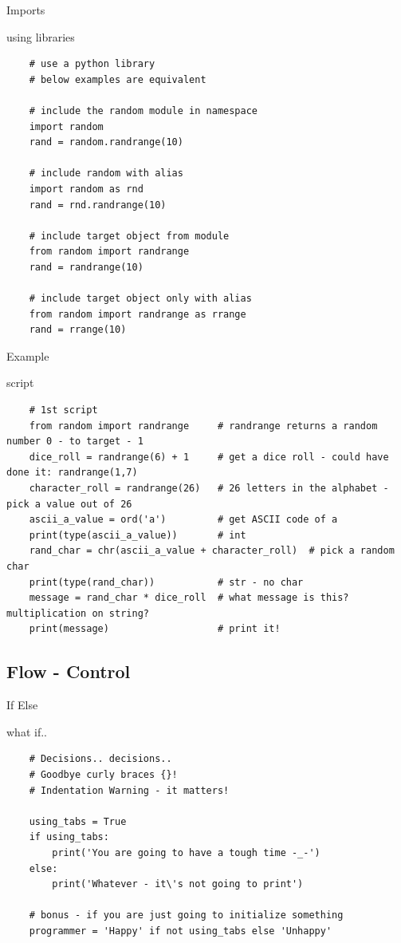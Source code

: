 \documentclass{bredelebeamer}
\begin{document}
\begin{frame}[fragile]{Imports}
  \begin{exampleblock}{using libraries}
    \begin{lstlisting}
    # use a python library
    # below examples are equivalent
    
    # include the random module in namespace
    import random
    rand = random.randrange(10)
    
    # include random with alias
    import random as rnd 
    rand = rnd.randrange(10)
    
    # include target object from module
    from random import randrange
    rand = randrange(10)
    
    # include target object only with alias
    from random import randrange as rrange
    rand = rrange(10)
    \end{lstlisting}
  \end{exampleblock}
\end{frame}

\begin{frame}[fragile]{Example}
  \begin{exampleblock}{script}
    \begin{lstlisting}
    # 1st script
    from random import randrange     # randrange returns a random number 0 - to target - 1
    dice_roll = randrange(6) + 1     # get a dice roll - could have done it: randrange(1,7)
    character_roll = randrange(26)   # 26 letters in the alphabet - pick a value out of 26
    ascii_a_value = ord('a')         # get ASCII code of a
    print(type(ascii_a_value))       # int
    rand_char = chr(ascii_a_value + character_roll)  # pick a random char
    print(type(rand_char))           # str - no char
    message = rand_char * dice_roll  # what message is this? multiplication on string?
    print(message)                   # print it!
    \end{lstlisting}
  \end{exampleblock}
\end{frame}

\subsection{Flow - Control}
\begin{frame}[fragile]{If Else}
  \begin{exampleblock}{what if..}
    \begin{lstlisting}
    # Decisions.. decisions..
    # Goodbye curly braces {}!
    # Indentation Warning - it matters!
    
    using_tabs = True
    if using_tabs:
        print('You are going to have a tough time -_-')
    else:
        print('Whatever - it\'s not going to print')
        
    # bonus - if you are just going to initialize something
    programmer = 'Happy' if not using_tabs else 'Unhappy'
    \end{lstlisting}
  \end{exampleblock}
\end{frame}
\end{document}
